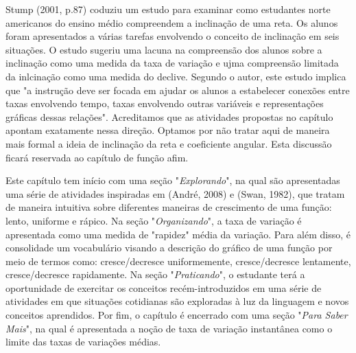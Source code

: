 \begin{apresentacao}
Stump (2001, p.87) coduziu um estudo para examinar como estudantes norte americanos do ensino médio compreendem a inclinação de uma reta. Os alunos foram apresentados a várias tarefas envolvendo o conceito de inclinação em seis situações. O estudo sugeriu uma lacuna na compreensão dos alunos sobre a inclinação como uma medida da taxa de variação e ujma compreensão limitada da inlcinação como uma medida do declive. Segundo o autor, este estudo implica que "a instrução deve ser focada em ajudar os alunos a estabelecer conexões entre taxas envolvendo tempo, taxas envolvendo outras variáveis e representações gráficas dessas relações". Acreditamos que as atividades propostas no capítulo apontam exatamente nessa direção. Optamos por não tratar aqui de maneira mais formal a ideia de inclinação da reta e coeficiente angular. Esta discussão ficará reservada ao capítulo de função afim.

Este capítulo tem início com uma seção "\textit{Explorando}", na qual são apresentadas uma série de atividades inspiradas em (André, 2008) e (Swan, 1982), que tratam de maneira intuitiva sobre diferentes maneiras de crescimento de uma função: lento, uniforme e rápico. Na seção "\textit{Organizando}", a taxa de variação é apresentada como uma medida de "rapidez"{} média da variação. Para além disso, é consolidade um vocabulário visando a descrição do gráfico de uma função por meio de termos como: cresce/decresce uniformemente, cresce/decresce lentamente, cresce/decresce rapidamente. Na seção "\textit{Praticando}"{}, o estudante terá a oportunidade de exercitar os conceitos recém-introduzidos em uma série de atividades em que situações cotidianas são exploradas à luz da linguagem e novos conceitos aprendidos. Por fim, o capítulo é encerrado com uma seção "\textit{Para Saber Mais}", na qual é apresentada a noção de taxa de variação instantânea como o limite das taxas de variações médias.
\end{apresentacao}

